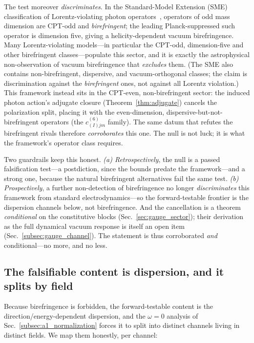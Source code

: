 The test moreover \emph{discriminates}. In the Standard-Model Extension (SME)
classification of Lorentz-violating photon
operators~\cite{kosteleckymewes2009,kosteleckyrussell2011}, operators of odd mass
dimension are CPT-odd and \emph{birefringent}; the leading Planck-suppressed such
operator is dimension five, giving a helicity-dependent vacuum birefringence. Many
Lorentz-violating models---in particular the CPT-odd, dimension-five and other
birefringent classes---populate this sector, and it is exactly the astrophysical
non-observation of vacuum birefringence that \emph{excludes} them. (The SME also contains
non-birefringent, dispersive, and vacuum-orthogonal classes; the claim is discrimination
against the \emph{birefringent} ones, not against all Lorentz violation.) This framework instead sits in the CPT-even, non-birefringent
sector: the induced photon action's adjugate closure (Theorem~\ref{thm:adjugate})
cancels the polarization split, placing it with the even-dimension, dispersive-but-not-
birefringent operators (the $c^{(6)}_{(I)jm}$ family). The same datum that refutes the
birefringent rivals therefore \emph{corroborates} this one. The null is not luck; it is
what the framework's operator class requires.

Two guardrails keep this honest. \emph{(a) Retrospectively}, the null is a passed
falsification test---a postdiction, since the bounds predate the framework---and a strong
one, because the natural birefringent alternatives fail the same test. \emph{(b) Prospectively}, a further non-detection of birefringence no longer
\emph{discriminates} this framework from standard electrodynamics---so the
forward-testable frontier is the dispersion channels below, not birefringence. And the
cancellation is a theorem \emph{conditional} on the constitutive blocks
(Sec.~\ref{sec:gauge_sector}); their derivation as the full dynamical vacuum response
is itself an open item (Sec.~\ref{subsec:gauge_channel}). The statement is thus
corroborated \emph{and} conditional---no more, and no less.

\subsection{The falsifiable content is dispersion, and it splits by field}
\label{subsec:falsifiability_map}

Because birefringence is forbidden, the forward-testable content is the
direction/energy-dependent dispersion, and the $\omega=0$ analysis of
Sec.~\ref{subsec:a1_normalization} forces it to split into distinct channels living in
distinct fields. We map them honestly, per channel:

